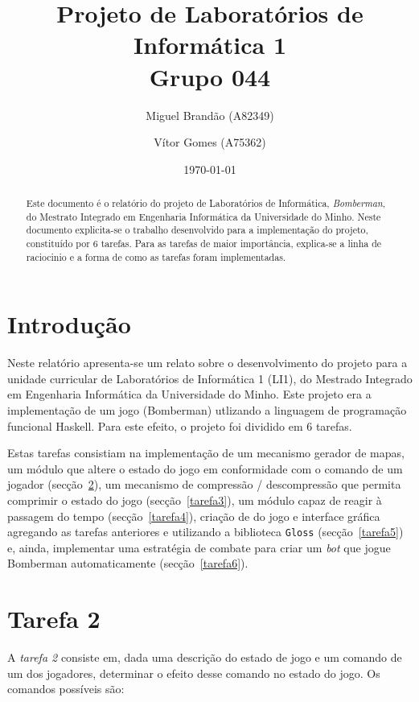 \documentclass[a4paper]{article}
\title{Projeto de Laboratórios de Informática 1\\Grupo 044}
\author{Miguel Brandão (A82349) \and Vítor Gomes (A75362)}
\date{\today}
\begin{document}
\maketitle

\begin{abstract}
 

  Este documento é o relatório do projeto de Laboratórios de Informática, \emph{Bomberman}, do Mestrato Integrado em Engenharia Informática da Universidade do Minho.
  Neste documento explicita-se o trabalho desenvolvido para a implementação do projeto, constituído por 6 tarefas. Para as tarefas de maior importância, explica-se a linha de raciocinio e a forma de como as tarefas foram implementadas.
\end{abstract}

\tableofcontents

\section{Introdução}
\label{sec:intro}

Neste relatório apresenta-se um relato sobre o desenvolvimento do projeto
para a unidade curricular de Laboratórios de Informática 1 (LI1),
do Mestrado Integrado em Engenharia Informática da Universidade do Minho.
Este projeto era a implementação de um jogo (Bomberman) utlizando a linguagem
de programação funcional Haskell.
Para este efeito, o projeto foi dividido em 6 tarefas.

Estas tarefas consistiam na implementação de um mecanismo gerador de mapas,
um módulo que altere o estado do jogo em conformidade com o comando de um
jogador (secção~\ref{tarefa2}), um mecanismo de compressão / descompressão
que permita comprimir o estado do jogo (secção~\ref{tarefa3}), um módulo
capaz de reagir à passagem do tempo (secção~\ref{tarefa4}), criação de
do jogo e interface gráfica agregando as tarefas anteriores e utilizando a
biblioteca \texttt{Gloss} (secção~\ref{tarefa5}) e, ainda, implementar uma estratégia de combate
para criar um \textit{bot} que jogue Bomberman automaticamente (secção~\ref{tarefa6}).


\section{Tarefa 2}
\label{tarefa2}

A \emph{tarefa 2} consiste em, dada uma descrição do estado de jogo e um comando de um dos jogadores, determinar o efeito desse comando no estado do jogo. Os comandos possíveis são:
\end{document}
